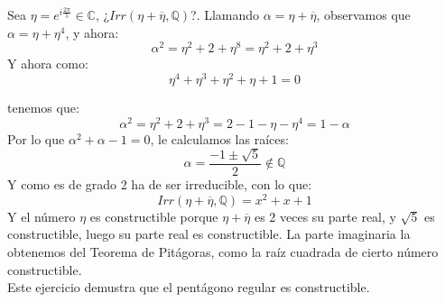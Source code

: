 \begin{ejercicio}
    Sea $\eta = e^{i\frac{2\pi}{5}}\in \mathbb{C}$, ¿$Irr(\eta+\overline{\eta},\mathbb{Q})$?. Llamando $\alpha = \eta+\overline{\eta}$, observamos que $\alpha = \eta + \eta^4$, y ahora:
    \begin{equation*}
        \alpha^2 = \eta^2 + 2+\eta^8 = \eta^2 + 2 + \eta^3
    \end{equation*}
    Y ahora como:
    \begin{equation*}
        \eta^4 + \eta^3 + \eta^2 + \eta + 1 = 0
    \end{equation*}

    tenemos que:
    \begin{equation*}
        \alpha^2 = \eta^2 + 2 + \eta^3 = 2 - 1 -\eta-\eta^4 = 1-\alpha
    \end{equation*}
    Por lo que $\alpha^2 + \alpha - 1 = 0$, le calculamos las raíces:
    \begin{equation*}
        \alpha = \dfrac{-1\pm \sqrt{5}}{2}\notin \mathbb{Q}
    \end{equation*}
    Y como es de grado 2 ha de ser irreducible, con lo que:
    \begin{equation*}
        Irr(\eta+\overline{\eta},\mathbb{Q}) = x^2+x+1
    \end{equation*}
    Y el número $\eta$ es constructible porque $\eta+\overline{\eta}$ es 2 veces su parte real, y $\sqrt{5}$ es constructible, luego su parte real es constructible. La parte imaginaria la obtenemos del Teorema de Pitágoras, como la raíz cuadrada de cierto número constructible.\\

    \noindent
    Este ejercicio demustra que el pentágono regular es constructible.
\end{ejercicio}
